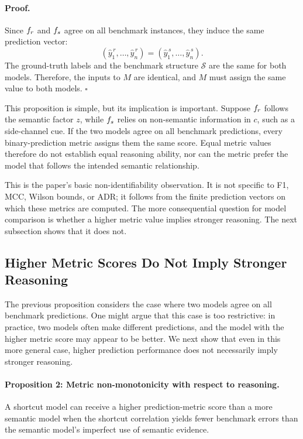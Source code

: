 \documentclass[acmsmall,screen,review,anonymous]{acmart}
\begin{document}
\paragraph{Proof.}
Since \(f_r\) and \(f_s\) agree on all benchmark instances,
they induce the same prediction vector:
\[
(\hat{y}^{\,r}_1,\ldots,\hat{y}^{\,r}_n)
=
(\hat{y}^{\,s}_1,\ldots,\hat{y}^{\,s}_n).
\]
The ground-truth labels and the benchmark structure \(\mathcal{S}\) are the
same for both models. Therefore, the inputs to \(M\) are identical, and
\(M\) must assign the same value to both models.
\(\square\)

This proposition is simple, but its implication is important.
%
Suppose \(f_r\) follows the semantic factor \(z\), while \(f_s\)
relies on non-semantic information in \(c\), such as a side-channel cue.
%
If the two models agree on all benchmark predictions, every
binary-prediction metric assigns them the same score. Equal metric values
therefore do not establish equal reasoning ability, nor can the metric prefer
the model that follows the intended semantic relationship.

This is the paper's basic non-identifiability observation. It is not specific
to F1, MCC, Wilson bounds, or ADR; it follows from the finite prediction
vectors on which these metrics are computed. The more consequential question
for model comparison is whether a higher metric value implies stronger
reasoning. The next subsection shows that it does not.

\subsection{Higher Metric Scores Do Not Imply Stronger Reasoning}

The previous proposition considers the case where two models agree on all
benchmark predictions. One might argue that this case is too restrictive:
in practice, two models often make different predictions, and the model with
the higher metric score may appear to be better. We next show that even in
this more general case, higher prediction performance does not necessarily
imply stronger reasoning.

\paragraph{Proposition 2: Metric non-monotonicity with respect to reasoning.}
A shortcut model can receive a higher prediction-metric score than a more
semantic model when the shortcut correlation yields fewer benchmark errors
than the semantic model's imperfect use of semantic evidence.
\end{document}
